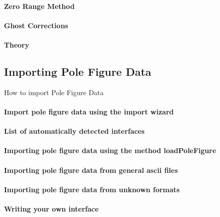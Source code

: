 \documentclass{article}
\begin{document}
			\paragraph{Zero Range Method}
		
			\paragraph{Ghost Corrections}
		
			\paragraph{Theory}
		
		\subsection{Importing Pole Figure Data}

		
                     \begin{par}
How to import Pole Figure Data
\end{par} \vspace{1em}

                  
			\paragraph{Import pole figure data using the import wizard}
		
			\paragraph{List of automatically detected interfaces}
		
			\paragraph{Importing pole figure data using the method loadPoleFigure}
		
			\paragraph{Importing pole figure data from general ascii files}
		
			\paragraph{Importing pole figure data from unknown formats}
		
			\paragraph{Writing your own interface}
		
\end{document}
